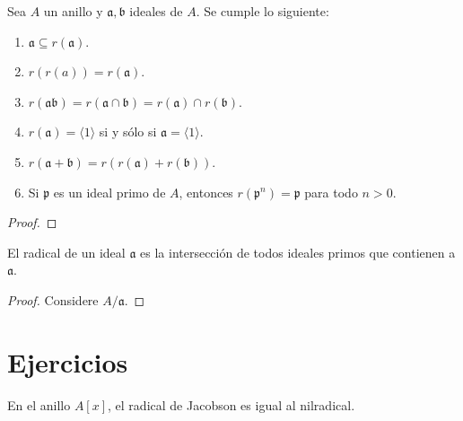\documentclass[12pt]{report}
\newcounter{it}
\theoremstyle{largebreak}
\newcommand{\gen}[1]{\ensuremath{\langle#1\rangle}}
\begin{document}
    \begin{excer}
        Sea $A$ un anillo y $\mathfrak{a},\mathfrak{b}$ ideales de $A$. Se cumple lo siguiente:
        \begin{enumerate}[label = \textit{(\arabic*)}]
            \item $\mathfrak{a}\subseteq r(\mathfrak{a})$.
            \item $r(r(a))=r(\mathfrak{a})$.
            \item $r(\mathfrak{a}\mathfrak{b})=r(\mathfrak{a}\cap\mathfrak{b})=r(\mathfrak{a})\cap r(\mathfrak{b})$.
            \item $r(\mathfrak{a})=\gen{1}$ si y sólo si $\mathfrak{a}=\gen{1}$.
            \item $r(\mathfrak{a}+\mathfrak{b})=r(r(\mathfrak{a})+r(\mathfrak{b}))$.
            \item Si $\mathfrak{p}$ es un ideal primo de $A$, entonces $r(\mathfrak{p}^n)=\mathfrak{p}$ para todo $n>0$.
        \end{enumerate}
    \end{excer}

    \begin{proof}
    \end{proof}
    
    \begin{propo}
        El radical de un ideal $\mathfrak{a}$ es la intersección de todos ideales primos que contienen a $\mathfrak{a}$.
    \end{propo}

    \begin{proof}
        Considere $A/\mathfrak{a}$.%
    \end{proof}

    \section{Ejercicios}

    \begin{excer}
        En el anillo $A[x]$, el radical de Jacobson es igual al nilradical.
    \end{excer}
\end{document}
